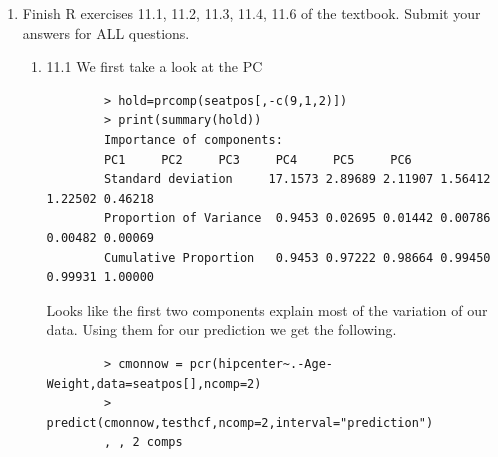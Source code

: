 \documentclass[11pt]{article}
\begin{document}
\begin{enumerate}
\item  Finish R exercises 11.1, 11.2, 11.3, 11.4, 11.6 of the textbook. Submit your answers for {\color{red}ALL} questions.
\begin{enumerate}
	\item 11.1
	We first take a look at the PC
	\begin{verbatim}
		> hold=prcomp(seatpos[,-c(9,1,2)])
		> print(summary(hold))
		Importance of components:
		PC1     PC2     PC3     PC4     PC5     PC6
		Standard deviation     17.1573 2.89689 2.11907 1.56412 1.22502 0.46218
		Proportion of Variance  0.9453 0.02695 0.01442 0.00786 0.00482 0.00069
		Cumulative Proportion   0.9453 0.97222 0.98664 0.99450 0.99931 1.00000
	\end{verbatim}
	Looks like the first two components explain most of the variation of our data.
	Using them for our prediction we get the following.
	\begin{verbatim}
		> cmonnow = pcr(hipcenter~.-Age-Weight,data=seatpos[],ncomp=2)
		> predict(cmonnow,testhcf,ncomp=2,interval="prediction")
		, , 2 comps
		

\end{verbatim}
\end{enumerate}
\end{enumerate}
\end{document}
